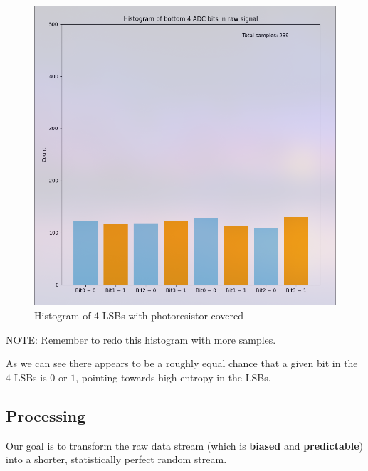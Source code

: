 \begin{figure}[h]
    \centering
    \includegraphics[width=0.6\linewidth]{./images/LSB_HISTOGRAM_COVERED_239.png} 
    \caption{Histogram of 4 LSBs with photoresistor covered}
    \label{fig:histogram_LSB_covered}
\end{figure}

NOTE: Remember to redo this histogram with more samples.

As we can see there appears to be a roughly equal chance that a 
given bit in the \(4\) LSBs is \(0\) or \(1\), pointing towards 
high entropy in the LSBs.
 

\subsection{Processing}
Our goal is to transform the raw data stream 
(which is \textbf{biased} and \textbf{predictable}) into a shorter, 
statistically perfect random stream.

